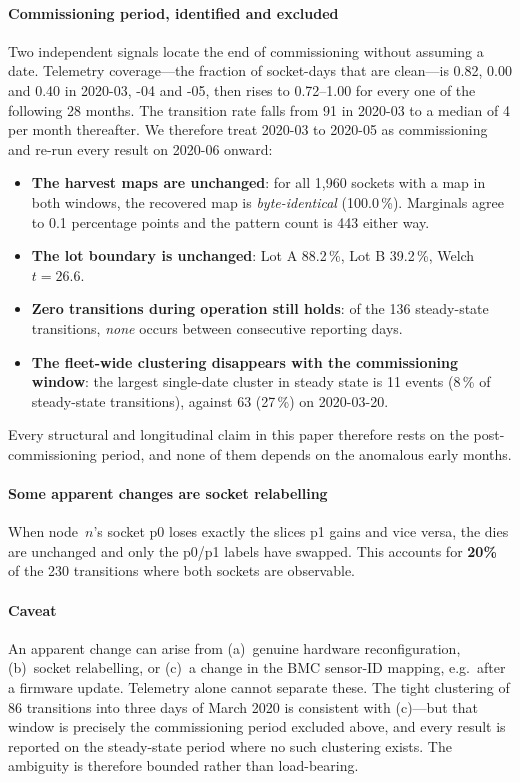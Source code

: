 \documentclass[10pt,conference]{IEEEtran}
\begin{document}
\paragraph{Commissioning period, identified and excluded}
\label{par:commissioning}
Two independent signals locate the end of commissioning without assuming a date. Telemetry
coverage---the fraction of socket-days that are clean---is 0.82, 0.00 and 0.40 in 2020-03, -04 and
-05, then rises to 0.72--1.00 for every one of the following 28 months. The transition rate falls
from 91 in 2020-03 to a median of 4 per month thereafter. We therefore treat 2020-03 to 2020-05 as
commissioning and re-run every result on 2020-06 onward:

\begin{itemize}\itemsep1pt
\item \textbf{The harvest maps are unchanged}: for all 1{,}960 sockets with a map in both windows,
      the recovered map is \emph{byte-identical} (100.0\,\%). Marginals agree to 0.1 percentage
      points and the pattern count is 443 either way.
\item \textbf{The lot boundary is unchanged}: Lot A 88.2\,\%, Lot B 39.2\,\%, Welch $t=26.6$.
\item \textbf{Zero transitions during operation still holds}: of the 136 steady-state transitions,
      \emph{none} occurs between consecutive reporting days.
\item \textbf{The fleet-wide clustering disappears with the commissioning window}: the largest
      single-date cluster in steady state is 11 events (8\,\% of steady-state transitions), against
      63 (27\,\%) on 2020-03-20.
\end{itemize}

Every structural and longitudinal claim in this paper therefore rests on the post-commissioning
period, and none of them depends on the anomalous early months.

\paragraph{Some apparent changes are socket relabelling} When node~$n$'s socket p0 loses exactly
the slices p1 gains and vice versa, the dies are unchanged and only the p0/p1 labels have swapped.
This accounts for \textbf{20\%} of the 230 transitions where both sockets are observable.

\paragraph{Caveat} An apparent change can arise from (a)~genuine hardware reconfiguration,
(b)~socket relabelling, or (c)~a change in the BMC sensor-ID mapping, e.g.\ after a firmware
update. Telemetry alone cannot separate these. The tight clustering of 86 transitions into three
days of March 2020 is consistent with (c)---but that window is precisely the commissioning period
excluded above, and every result is reported on the steady-state period where no such clustering
exists. The ambiguity is therefore bounded rather than load-bearing.
\end{document}
